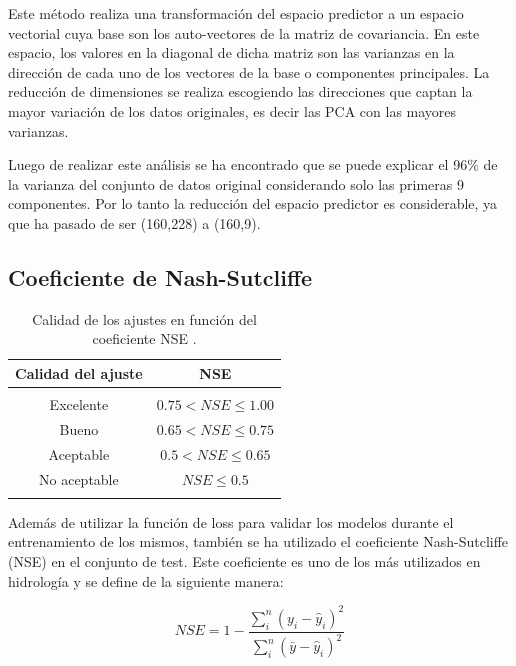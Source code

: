 Este método realiza una transformación del espacio predictor a un espacio vectorial 
cuya base son los auto-vectores de la matriz de covariancia. 
En este espacio, los valores en la diagonal de dicha matriz son las varianzas
en la dirección de cada uno de los vectores de la base o componentes principales.
La reducción de dimensiones se realiza escogiendo las direcciones que captan la mayor variación 
de los datos originales, es decir las PCA con las mayores varianzas. 

Luego de realizar este análisis se ha encontrado que se puede explicar el 96$\%$ de la varianza del conjunto
de datos original considerando solo las primeras 9 componentes. Por lo tanto la reducción del espacio
predictor es considerable, ya que ha pasado de ser (160,228) a (160,9).


\subsection{Coeficiente de Nash-Sutcliffe}
\label{sectNSE}


\begin{table}[h!]
  \begin{center}
  \begin{tabular}{|c|c|}
    \hline
    Calidad del ajuste &   NSE  \\
    \hline
     &   \\
   Excelente & $0.75 < NSE \leq 1.00$   \\
   Bueno &  $0.65<  NSE \leq 0.75$ \\
   Aceptable &  $0.5<  NSE \leq 0.65$  \\
   No aceptable &  $ NSE \leq 0.5$ \\
   &   \\
   \hline
  \end{tabular}
  \caption{Calidad de los ajustes en función del coeficiente NSE \cite{NSE}.}
  \label{tablaNSE}
\end{center}
  \end{table}

Además de utilizar la función de loss para validar los modelos durante el entrenamiento de los mismos, 
también se ha utilizado el coeficiente Nash-Sutcliffe (NSE) \cite{NSE} en el conjunto de test. Este coeficiente
es uno de los más utilizados en hidrología y se define de la siguiente manera:

\begin{equation}
  NSE = 1-\frac{\sum^n_i(y_i-\hat{y}_i)^2}{\sum^n_i(\bar{y}-\hat{y}_i)^2}
\end{equation}

